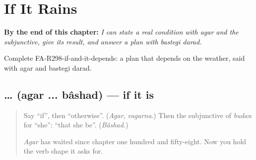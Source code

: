 
\chapter{If It Rains}
\label{ch:fa-if-it-rains}

\begin{chapteropening}
\textbf{By the end of this chapter:} \emph{I can state a real condition with agar and the subjunctive, give its result, and answer a plan with bastegi darad.}

Complete FA-R298-if-and-it-depends: a plan that depends on the weather, said with agar and bastegi darad.
\end{chapteropening}

\section[\texorpdfstring{\fa{اگر} … \fa{باشد} (agar ... bâshad)}{اگر … باشد (agar ... bâshad)}]{ …  (agar ... bâshad) — if it is}

\label{lesson:FA-C298-agar}



\begin{quote}
Say \textquotedblleft{}if\textquotedblright{}, then \textquotedblleft{}otherwise\textquotedblright{}. (\emph{Agar}, \emph{vagarna}.) Then the subjunctive of \emph{budan} for \textquotedblleft{}she\textquotedblright{}: \textquotedblleft{}that she be\textquotedblright{}. (\emph{Bâshad.})

\emph{Agar} has waited since chapter one hundred and fifty-eight. Now you hold the verb shape it asks for.
\end{quote}

